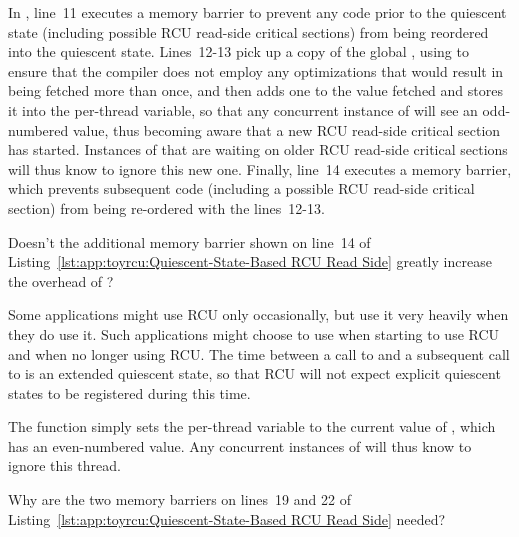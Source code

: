 In , line~11 executes a memory barrier
to prevent any code prior to the quiescent state (including possible
RCU read-side critical sections) from being reordered
into the quiescent state.
Lines~12-13 pick up a copy of the global , using
 to ensure that the compiler does not employ any
optimizations that would result in  being fetched
more than once,
and then adds one to the value fetched and stores it into
the per-thread  variable, so that any concurrent
instance of  will see an odd-numbered value,
thus becoming aware that a new RCU read-side critical section has started.
Instances of  that are waiting on older
RCU read-side critical sections will thus know to ignore this new one.
Finally, line~14 executes a memory barrier, which prevents subsequent
code (including a possible RCU read-side critical section) from being
re-ordered with the lines~12-13.

\QuickQuiz{}
	Doesn't the additional memory barrier shown on line~14 of
	Listing~\ref{lst:app:toyrcu:Quiescent-State-Based RCU Read Side}
	greatly increase the overhead of ?
 \QuickQuizEnd

Some applications might use RCU only occasionally, but use it very heavily
when they do use it.
Such applications might choose to use  when
starting to use RCU and  when no longer
using RCU.
The time between a call to  and a subsequent
call to  is an extended quiescent state,
so that RCU will not expect explicit quiescent states to be registered
during this time.

The  function simply sets the
per-thread  variable to the current value of
, which has an even-numbered value.
Any concurrent instances of  will thus know to
ignore this thread.

\QuickQuiz{}
	Why are the two memory barriers on lines~19 and 22 of
	Listing~\ref{lst:app:toyrcu:Quiescent-State-Based RCU Read Side}
	needed?
 \QuickQuizEnd

